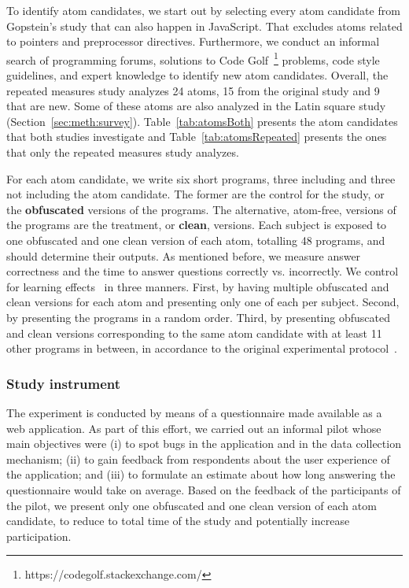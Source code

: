To identify atom candidates, we start out by selecting every atom candidate from Gopstein's study that can also happen in JavaScript. That excludes atoms related to pointers and preprocessor directives. Furthermore, we conduct an informal search of programming forums, solutions to Code Golf~\footnote{https://codegolf.stackexchange.com/} problems, code style guidelines, and expert knowledge to identify new atom candidates. Overall, the repeated measures study analyzes 24 atoms, 15 from the original study and 9 that are new. Some of these atoms are also analyzed in the Latin square study (Section~\ref{sec:meth:survey}). Table~\ref{tab:atomsBoth} presents the atom candidates that both studies investigate and Table~\ref{tab:atomsRepeated} presents the ones that only the repeated measures study analyzes. 



For each atom candidate, we write six short programs, three including and three not including the atom candidate. The former are the control for the study, or the \textbf{obfuscated} versions of the programs. The alternative, atom-free, versions of the programs are the treatment, or \textbf{clean}, versions. Each subject is exposed to one obfuscated and one clean version of each atom, totalling 48 programs, and should determine their outputs. As mentioned before, we measure answer correctness and the time to answer questions correctly vs. incorrectly. We control for learning effects~\cite{Neely:1991:SPE} in three manners. First, by having multiple obfuscated and clean versions for each atom and presenting only one of each per subject. Second, by presenting the programs in a random order. Third, by presenting obfuscated and clean versions corresponding to the same atom candidate with at least 11 other programs in between, in  accordance to the original experimental protocol~\cite{DBLP:conf/sigsoft/GopsteinIYDZYC17}. 

\subsubsection*{Study instrument} 

The experiment is conducted by means of a questionnaire made available as a web application. As part of this effort, we carried out an informal pilot whose main objectives were (i) to spot bugs in the application and in the data collection mechanism; (ii) to gain feedback from respondents about the user experience of the application; and (iii) to formulate an estimate about how long answering the questionnaire would take on average. Based on the feedback of the participants of the pilot, we present only one obfuscated and one clean version of each atom candidate, to reduce to total time of the study and potentially increase participation.%

